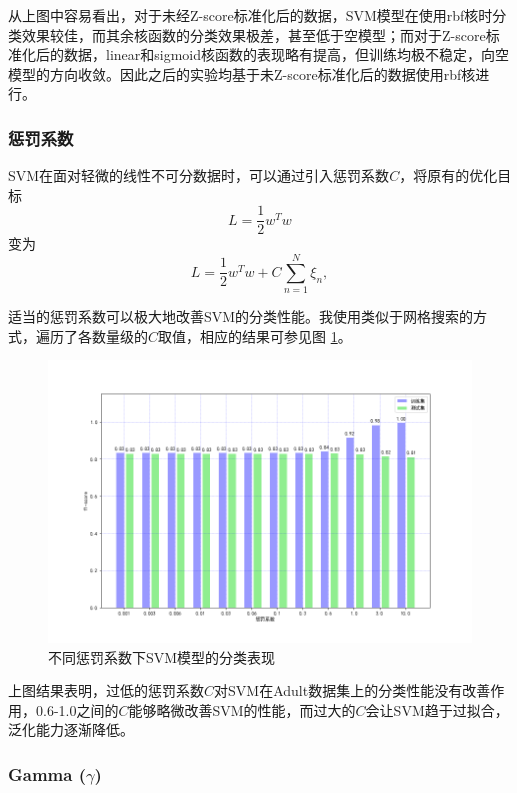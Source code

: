\documentclass[12pt,a4paper]{article}
\theoremstyle{definition}
\begin{document}
\vspace{0.01\linewidth}
从上图中容易看出，对于未经Z-score标准化后的数据，SVM模型在使用rbf核时分类效果较佳，而其余核函数的分类效果极差，甚至低于空模型；而对于Z-score标准化后的数据，linear和sigmoid核函数的表现略有提高，但训练均极不稳定，向空模型的方向收敛。因此之后的实验均基于未Z-score标准化后的数据使用rbf核进行。

\subsubsection{惩罚系数}
\label{sec:penalty}

SVM在面对轻微的线性不可分数据时，可以通过引入惩罚系数$C$，将原有的优化目标
\begin{equation}
	L = \dfrac{1}{2}w^Tw
\end{equation}
变为
\begin{equation}
	L = \dfrac{1}{2}w^Tw+C\sum\limits_{n=1}^{N}\xi_n,
\end{equation}

适当的惩罚系数可以极大地改善SVM的分类性能。我使用类似于网格搜索的方式，遍历了各数量级的$C$取值，相应的结果可参见图 \ref{fig:penalty}。

\begin{figure}[H]
	\centering
	\includegraphics[width=0.75\linewidth]{img/svm_penalty.png}
	\caption{不同惩罚系数下SVM模型的分类表现}
	\label{fig:penalty}
\end{figure}

上图结果表明，过低的惩罚系数$C$对SVM在Adult数据集上的分类性能没有改善作用，0.6-1.0之间的$C$能够略微改善SVM的性能，而过大的$C$会让SVM趋于过拟合，泛化能力逐渐降低。

\subsubsection{Gamma ($\gamma$)}
\end{document}
